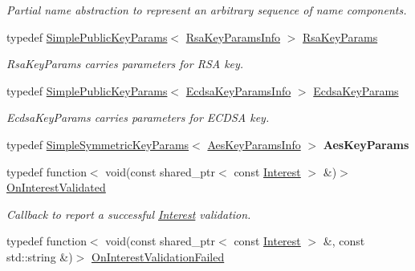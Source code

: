 \begin{DoxyCompactItemize}
\begin{DoxyCompactList}\small\item\em Partial name abstraction to represent an arbitrary sequence of name components. \end{DoxyCompactList}\item 
typedef \hyperlink{classndn_1_1SimplePublicKeyParams}{Simple\+Public\+Key\+Params}$<$ \hyperlink{classndn_1_1RsaKeyParamsInfo}{Rsa\+Key\+Params\+Info} $>$ \hyperlink{namespacendn_ae610775b86cefd44fb0d9b171861c964}{Rsa\+Key\+Params}\hypertarget{namespacendn_ae610775b86cefd44fb0d9b171861c964}{}\label{namespacendn_ae610775b86cefd44fb0d9b171861c964}

\begin{DoxyCompactList}\small\item\em Rsa\+Key\+Params carries parameters for R\+SA key. \end{DoxyCompactList}\item 
typedef \hyperlink{classndn_1_1SimplePublicKeyParams}{Simple\+Public\+Key\+Params}$<$ \hyperlink{classndn_1_1EcdsaKeyParamsInfo}{Ecdsa\+Key\+Params\+Info} $>$ \hyperlink{namespacendn_a3734bd9999ad5cacee906e2135b23ee1}{Ecdsa\+Key\+Params}\hypertarget{namespacendn_a3734bd9999ad5cacee906e2135b23ee1}{}\label{namespacendn_a3734bd9999ad5cacee906e2135b23ee1}

\begin{DoxyCompactList}\small\item\em Ecdsa\+Key\+Params carries parameters for E\+C\+D\+SA key. \end{DoxyCompactList}\item 
typedef \hyperlink{classndn_1_1SimpleSymmetricKeyParams}{Simple\+Symmetric\+Key\+Params}$<$ \hyperlink{classndn_1_1AesKeyParamsInfo}{Aes\+Key\+Params\+Info} $>$ {\bfseries Aes\+Key\+Params}\hypertarget{namespacendn_a56758af4cd4c169bc78f6e788c2076b9}{}\label{namespacendn_a56758af4cd4c169bc78f6e788c2076b9}

\item 
typedef function$<$ void(const shared\+\_\+ptr$<$ const \hyperlink{classndn_1_1Interest}{Interest} $>$ \&)$>$ \hyperlink{namespacendn_a90fe4b4d97a7870d87f2fce8fdc88f95}{On\+Interest\+Validated}\hypertarget{namespacendn_a90fe4b4d97a7870d87f2fce8fdc88f95}{}\label{namespacendn_a90fe4b4d97a7870d87f2fce8fdc88f95}

\begin{DoxyCompactList}\small\item\em Callback to report a successful \hyperlink{classndn_1_1Interest}{Interest} validation. \end{DoxyCompactList}\item 
typedef function$<$ void(const shared\+\_\+ptr$<$ const \hyperlink{classndn_1_1Interest}{Interest} $>$ \&, const std\+::string \&)$>$ \hyperlink{namespacendn_a6cb4f04de7c1e8da06d8f5865b3d2877}{On\+Interest\+Validation\+Failed}\hypertarget{namespacendn_a6cb4f04de7c1e8da06d8f5865b3d2877}{}\label{namespacendn_a6cb4f04de7c1e8da06d8f5865b3d2877}


\end{DoxyCompactItemize}
